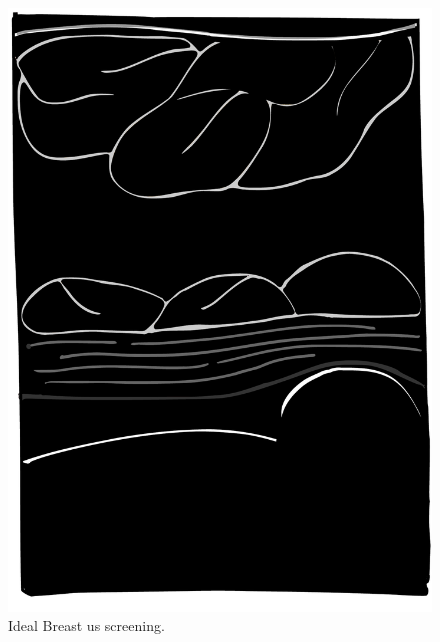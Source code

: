 \begin{frame}
\begin{columns}
\begin{column}{.48\textwidth}
  \vspace{-10pt}
		\begin{figure}
\includegraphics[width=.7\textwidth]{US.pdf}
        \caption{Ideal Breast \ac{us} screening.}
		\end{figure}
\end{column}
\end{columns}
\end{frame}

